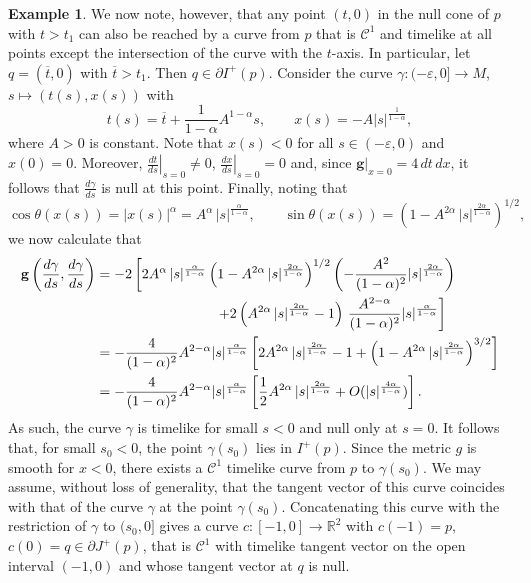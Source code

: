 \documentclass[reqno]{amsart}
\numberwithin{equation}{section}
\theoremstyle{plain}
\theoremstyle{definition}
\newtheorem{example}[theorem]{Example}
\theoremstyle{remark}
\newcommand\eps{\ensuremath{\varepsilon}}
\newcommand\g{\ensuremath{\mathbf{g}}}
\newcommand\R{\ensuremath{\mathbb{R}}}
\begin{document}
\begin{example}
We now note, however, that any point $(t, 0)$ in the null cone of $p$ with $t > t_1$ can also be reached by a curve from $p$ that is $\mathcal{C}^1$ and timelike at all points except the intersection of the curve with the $t$-axis. In particular, let $q = (\overline{t}, 0)$ with $\overline{t} > t_1$. Then $q \in \partial I^+(p)$. Consider the curve $\gamma \colon (-\eps, 0] \to M$, $s \mapsto \left( t(s), x(s) \right)$ with 
\[
t(s) = \overline{t} + \frac{1}{1-\alpha} A^{1-\alpha} s, \qquad x(s) = - A |s|^{\frac{1}{1-\alpha}}, 
\]
where $A > 0$ is constant. Note that $x(s) < 0$ for all $s \in (-\eps, 0)$ and $x(0) = 0$. Moreover, $\left. \frac{dt}{ds} \right|_{s=0} \neq 0$, $\left. \frac{dx}{ds} \right|_{s=0} = 0$ and, since $\left. \g \right|_{x=0} = 4 \, dt \, dx$, it follows that $\frac{d\gamma}{ds}$ is null at this point. Finally, noting that 
\[
\cos\theta(x(s)) = |x(s)|^{\alpha} = A^{\alpha} \, |s|^{\frac{\alpha}{1-\alpha}}, \qquad \sin\theta(x(s)) = \left( 1-A^{2\alpha} \, |s|^{\frac{2\alpha}{1-\alpha}} \right)^{1/2}, 
\]
we now calculate that 
\begin{align*}
\g \left( \frac{d\gamma}{ds}, \frac{d\gamma}{ds} \right) 
&= -2 \left[ 2 A^{\alpha} \, |s|^{\frac{\alpha}{1-\alpha}} \left( 1-A^{2\alpha} \, |s|^{\frac{2\alpha}{1-\alpha}} \right)^{1/2} \left( - \frac{A^2}{(1-\alpha)^2} |s|^{\frac{2\alpha}{1-\alpha}} \right) \right. 
\\
&\hskip 3cm \left.  
+ 2 \left( A^{2\alpha} \, |s|^{\frac{2\alpha}{1-\alpha}} - 1 \right)  \, \frac{A^{2-\alpha}}{(1-\alpha)^2} |s|^{\frac{\alpha}{1-\alpha}} \right] 
\\
&= - \frac{4}{(1-\alpha)^2} A^{2-\alpha} |s|^{\frac{\alpha}{1-\alpha}} \left[ 2 A^{2\alpha} \, |s|^{\frac{2\alpha}{1-\alpha}} - 1 + \left( 1 - A^{2\alpha} \, |s|^{\frac{2\alpha}{1-\alpha}} \right)^{3/2} \right]
\\
&= - \frac{4}{(1-\alpha)^2} A^{2-\alpha} |s|^{\frac{\alpha}{1-\alpha}} \left[ \frac{1}{2} A^{2\alpha} \, |s|^{\frac{2\alpha}{1-\alpha}} + O(|s|^{\frac{4\alpha}{1-\alpha}}) \right]. 
\end{align*}
As such, the curve $\gamma$ is timelike for small $s < 0$ and null only at $s=0$. It follows that, for small $s_0 < 0$, the point $\gamma(s_0)$ lies in $I^+(p)$. Since the metric $g$ is smooth for $x < 0$, there exists a $\mathcal{C}^1$ timelike curve from $p$ to $\gamma(s_0)$. We may assume, without loss of generality, that the tangent vector of this curve coincides with that of the curve $\gamma$ at the point $\gamma(s_0)$. Concatenating this curve with the restriction of $\gamma$ to $(s_0, 0]$ gives a curve $c \colon [-1, 0] \to \R^2$ with $c(-1) = p$, $c(0) = q \in \partial J^+(p)$, that is $\mathcal{C}^1$ with timelike tangent vector on the open interval $(-1, 0)$ and whose tangent vector at $q$ is null. 


\end{example}
\end{document}
